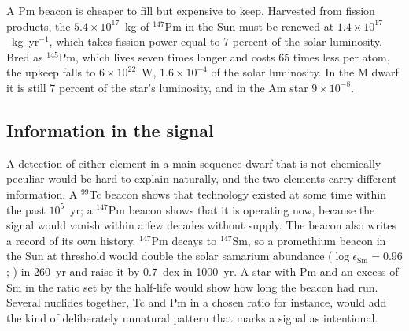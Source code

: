 \documentclass[final,5p]{elsarticle}
\begin{document}
A Pm beacon is cheaper to fill but expensive to keep. Harvested from fission products, the $5.4\times10^{17}$~kg of $^{147}$Pm in the Sun must be renewed at $1.4\times10^{17}$~kg~yr$^{-1}$, which takes fission power equal to 7 percent of the solar luminosity. Bred as $^{145}$Pm, which lives seven times longer and costs 65 times less per atom, the upkeep falls to $6\times10^{22}$~W, $1.6\times10^{-4}$ of the solar luminosity. In the M dwarf it is still 7 percent of the star's luminosity, and in the Am star $9\times10^{-8}$.

\subsection{Information in the signal}
\label{sec:signal}

A detection of either element in a main-sequence dwarf that is not chemically peculiar would be hard to explain naturally, and the two elements carry different information. A $^{99}$Tc beacon shows that technology existed at some time within the past $10^{5}$~yr; a $^{147}$Pm beacon shows that it is operating now, because the signal would vanish within a few decades without supply. The beacon also writes a record of its own history. $^{147}$Pm decays to $^{147}$Sm, so a promethium beacon in the Sun at threshold would double the solar samarium abundance ($\log\epsilon_\mathrm{Sm} = 0.96$; \citealt{Asplund2009}) in 260~yr and raise it by 0.7~dex in 1000~yr. A star with Pm and an excess of Sm in the ratio set by the half-life would show how long the beacon had run. Several nuclides together, Tc and Pm in a chosen ratio for instance, would add the kind of deliberately unnatural pattern that marks a signal as intentional.
\end{document}
